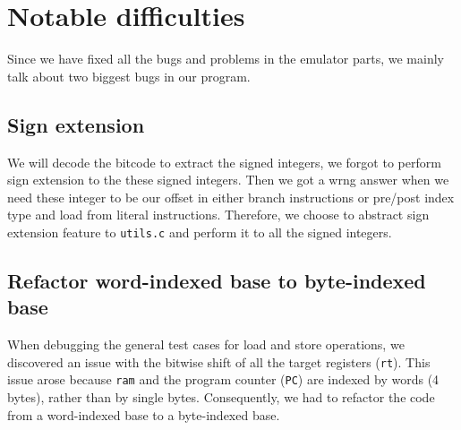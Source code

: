 \documentclass[11pt]{article}
\begin{document}
\section{Notable difficulties}
Since we have fixed all the bugs and problems in the emulator parts, we mainly
talk about two biggest bugs in our program. 

\subsection{Sign extension}
We will decode the bitcode to extract the signed integers, we forgot to perform 
sign extension to the these signed integers. Then we got a wrng answer when we need these integer to 
be our offset in either branch instructions or pre/post index type and load from literal instructions. 
Therefore, we choose to abstract sign extension feature to \texttt{utils.c} and perform it 
to all the signed integers. 

\subsection{Refactor word-indexed base to byte-indexed base}
When debugging the general test cases for load and store operations, 
we discovered an issue with the bitwise shift of all the target registers (\texttt{rt}). 
This issue arose because \texttt{ram} and the program counter (\texttt{PC}) are indexed by words (4 bytes), 
rather than by single bytes. 
Consequently, we had to refactor the code from a word-indexed base to a byte-indexed base.
\end{document}
